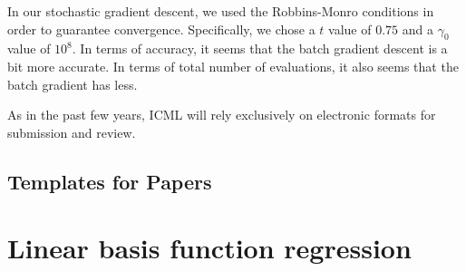 \documentclass{article}
\begin{document}
In our stochastic gradient descent, we used the Robbins-Monro conditions in order to guarantee convergence. Specifically, we chose a $t$ value of $0.75$ and a $\gamma_{0}$ value of $10^{8}$. In terms of accuracy, it seems that the batch gradient descent is a bit more accurate. In terms of total number of evaluations, it also seems that the batch gradient has less.     
 
\label{submission}

As in the past few years, ICML will rely exclusively on
electronic formats for submission and review.


\subsection{Templates for Papers}


\section{Linear basis function regression}
\end{document}
